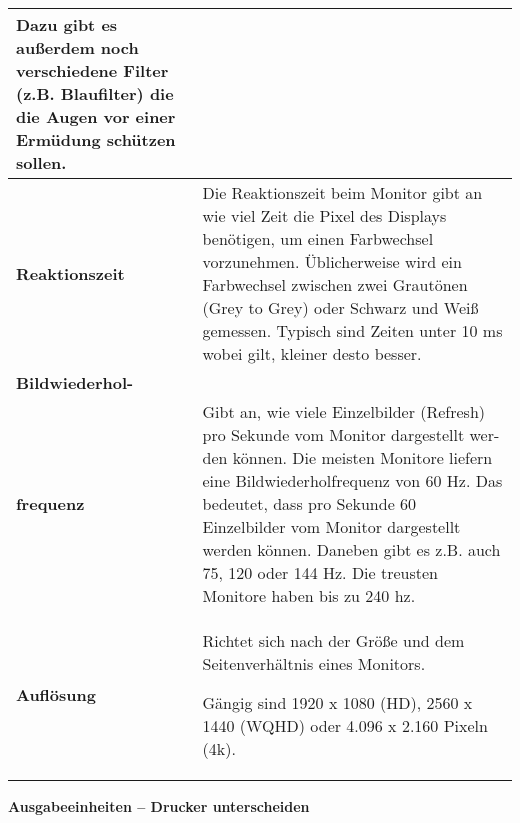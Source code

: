\documentclass[asp1.tex]{subfiles}
\begin{document}
\begin{longtable}{|p{}|p{}|}
    Dazu gibt es außerdem noch verschiedene Filter (z.B. Blaufilter) die die Augen vor einer Ermüdung schützen sollen.
    \\\hline

    \textbf{Reaktionszeit}             &
    Die Reaktionszeit beim Monitor gibt an wie viel Zeit die Pixel des Displays benötigen, um einen Farbwechsel vorzunehmen. Üblicherweise wird ein Farbwechsel zwischen zwei Grautönen (Grey to Grey) oder Schwarz und Weiß gemessen. Typisch sind Zeiten unter 10 ms wobei gilt, kleiner desto besser.
    \\\hline

    \textbf{Bildwiederhol-}              \\\textbf{frequenz}&
    Gibt an, wie viele Einzelbilder (Refresh) pro Sekunde vom Monitor dargestellt wer-den können. Die meisten Monitore liefern eine Bildwiederholfrequenz von 60 Hz. Das bedeutet, dass pro Sekunde 60 Einzelbilder vom Monitor dargestellt werden können. Daneben gibt es z.B. auch 75, 120 oder 144 Hz. Die treusten Monitore haben bis zu 240 hz.
    \\\hline

    \textbf{Auflösung}                 &
    Richtet sich nach der Größe und dem Seitenverhältnis eines Monitors.

    Gängig sind 1920 x 1080 (HD), 2560 x 1440 (WQHD) oder 4.096 x 2.160 Pixeln (4k).

    \\\hline
\end{longtable}

\textbf{Ausgabeeinheiten – Drucker unterscheiden}
\end{document}
